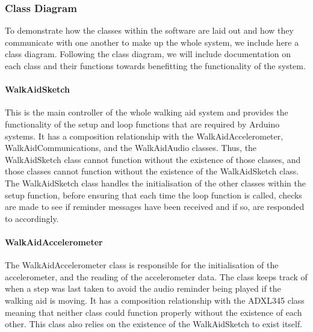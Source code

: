             \subsubsection{Class Diagram}
            \label{subsubsec:class_diagram_walking_aid}

                To demonstrate how the classes within the software are laid out and how they communicate with one another to make up the whole system, we include here a class diagram. Following the class diagram, we will include documentation on each class and their functions towards benefitting the functionality of the system. 

                \clearpage
                \thispagestyle{empty}
                \begin{landscape}
                    
                \end{landscape}

                \paragraph{WalkAidSketch}\mbox{}

                    This is the main controller of the whole walking aid system and provides the functionality of the setup and loop functions that are required by Arduino systems. It has a composition relationship with the WalkAidAccelerometer, WalkAidCommunications, and the WalkAidAudio classes. Thus, the WalkAidSketch class cannot function without the existence of those classes, and those classes cannot function without the existence of the WalkAidSketch class. The WalkAidSketch class handles the initialisation of the other classes within the setup function, before ensuring that each time the loop function is called, checks are made to see if reminder messages have been received and if so, are responded to accordingly.

                \paragraph{WalkAidAccelerometer}\mbox{}

                    The WalkAidAccelerometer class is responsible for the initialisation of the accelerometer, and the reading of the accelerometer data. The class keeps track of when a step was last taken to avoid the audio reminder being played if the walking aid is moving. It has a composition relationship with the ADXL345 class meaning that neither class could function properly without the existence of each other. This class also relies on the existence of the WalkAidSketch to exist itself.


